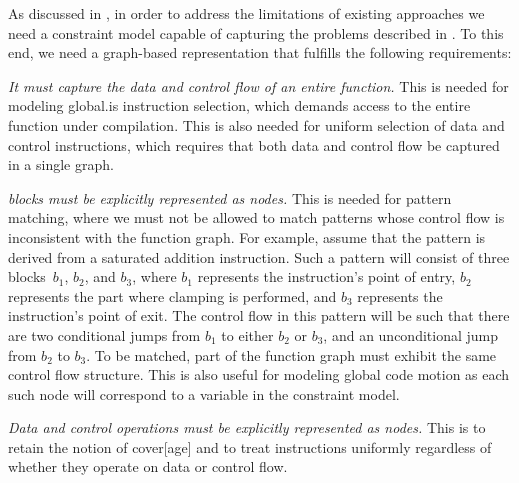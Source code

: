 As discussed in , in order to
address the limitations of existing approaches we need a \gls{constraint model}
capable of capturing the problems described in .
%
To this end, we need a \gls{graph}-based representation that fulfills the
following requirements:
%
\def\typesetReq#1{\emph{#1}}%
\begin{requirements}
  \item {}
    \typesetReq{It must capture the data and control flow of an entire
      \gls{function}.}
    This is needed for modeling \gls{global.is} \gls{instruction selection},
    which demands access to the entire \gls{function} under compilation.
    This is also needed for uniform selection of data and control
    \glspl{instruction}, which requires that both data and control flow be
    captured in a single \gls{graph}.

  \item {}
    \typesetReq{\Glspl{block} must be explicitly represented as \glspl{node}.}
    This is needed for \gls{pattern matching}, where we must not be allowed to
    match \glspl{pattern} whose control flow is inconsistent with the
    \gls{function graph}.
    For example, assume that the \gls{pattern} is derived from a saturated
    addition \gls{instruction}.
    Such a \gls{pattern} will consist of three \glspl{block}~$b_1$, $b_2$, and
    $b_3$, where $b_1$ represents the \gls{instruction}'s point of entry, $b_2$
    represents the part where clamping is performed, and $b_3$ represents the
    \gls{instruction}'s point of exit.
    The control flow in this \gls{pattern} will be such that there are two
    conditional jumps from $b_1$ to either $b_2$ or $b_3$, and an unconditional
    jump from $b_2$ to $b_3$.
    To be matched, part of the \gls{function graph} must exhibit the same
    control flow structure.
    This is also useful for modeling \gls{global code motion} as each such
    \gls{node} will correspond to a \gls{variable} in the \gls{constraint
      model}.

  \item {}
    \typesetReq{Data and control \glspl{operation} must be explicitly
      represented as \glspl{node}.}
    This is to retain the notion of \gls{cover}[age] and to treat
    \glspl{instruction} uniformly regardless of whether they operate on data or
    control flow.


\end{requirements}
